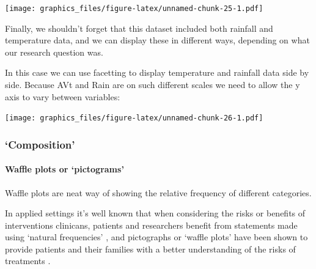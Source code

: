 \documentclass[]{article}
\newenvironment{Shaded}{\begin{snugshade}}{\end{snugshade}}
\newcommand{\KeywordTok}[1]{\textcolor[rgb]{0.13,0.29,0.53}{\textbf{#1}}}
\newcommand{\DataTypeTok}[1]{\textcolor[rgb]{0.13,0.29,0.53}{#1}}
\newcommand{\StringTok}[1]{\textcolor[rgb]{0.31,0.60,0.02}{#1}}
\newcommand{\OperatorTok}[1]{\textcolor[rgb]{0.81,0.36,0.00}{\textbf{#1}}}
\newcommand{\NormalTok}[1]{#1}
\let\oldparagraph\paragraph
\renewcommand{\paragraph}[1]{\oldparagraph{#1}\mbox{}}
\theoremstyle{definition}
\theoremstyle{definition}
\theoremstyle{definition}
\theoremstyle{remark}
\begin{document}
\texttt{[image: graphics\_files/figure-latex/unnamed-chunk-25-1.pdf]}

Finally, we shouldn't forget that this dataset included both rainfall
and temperature data, and we can display these in different ways,
depending on what our research question was.

In this case we can use facetting to display temperature and rainfall
data side by side. Because AVt and Rain are on such different scales we
need to allow the y axis to vary between variables:

\begin{Shaded}
\end{Shaded}

\texttt{[image: graphics\_files/figure-latex/unnamed-chunk-26-1.pdf]}

\subsubsection*{\texorpdfstring{`Composition'}{Composition}}\label{composition}

\paragraph{\texorpdfstring{Waffle plots or
`pictograms'}{Waffle plots or pictograms}}\label{waffle-plots-or-pictograms}

Waffle plots are neat way of showing the relative frequency of different
categories.

In applied settings it's well known that when considering the risks or
benefits of interventions clinicans, patients and researchers benefit
from statements made using `natural frequencies'
\citep{gigerenzer2003simple}, and pictographs or `waffle plots' have
been shown to provide patients and their families with a better
understanding of the risks of treatments \citep{tait2010presenting}.
\end{document}
